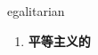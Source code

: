 
\begin{frame}
{\huge egalitarian}
\begin{center}
\begin{enumerate}\Large
  \item \textbf{平等主义的}
\end{enumerate}
\end{center}
\end{frame}
